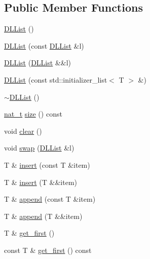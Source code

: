 \subsection*{Public Member Functions}
\begin{DoxyCompactItemize}
\item 
\hyperlink{class_designar_1_1_d_l_list_af85c4b65efde3c33ad011bf6bb7444b0}{D\+L\+List} ()
\item 
\hyperlink{class_designar_1_1_d_l_list_a4be2c1cdec495bacc879851956e96d9d}{D\+L\+List} (const \hyperlink{class_designar_1_1_d_l_list}{D\+L\+List} \&l)
\item 
\hyperlink{class_designar_1_1_d_l_list_a8408964dd17ca747a9a21b141b05630e}{D\+L\+List} (\hyperlink{class_designar_1_1_d_l_list}{D\+L\+List} \&\&l)
\item 
\hyperlink{class_designar_1_1_d_l_list_a8a6c4e93a8eaf2b113c1b86d0e05f406}{D\+L\+List} (const std\+::initializer\+\_\+list$<$ T $>$ \&)
\item 
\hyperlink{class_designar_1_1_d_l_list_a095cfa30b7eba01f1dc7e3fe6d35f013}{$\sim$\+D\+L\+List} ()
\item 
\hyperlink{namespace_designar_aa72662848b9f4815e7bf31a7cf3e33d1}{nat\+\_\+t} \hyperlink{class_designar_1_1_d_l_list_a77234df6ebb6620ecf124e1810d9741c}{size} () const
\item 
void \hyperlink{class_designar_1_1_d_l_list_a0b617ee4b2f03b58b74630f79566f1b8}{clear} ()
\item 
void \hyperlink{class_designar_1_1_d_l_list_a34bdcc8016583c3e0ab50b4d3a87117b}{swap} (\hyperlink{class_designar_1_1_d_l_list}{D\+L\+List} \&l)
\item 
T \& \hyperlink{class_designar_1_1_d_l_list_ad153fdaa8982b2276266e1e0dbb8b773}{insert} (const T \&item)
\item 
T \& \hyperlink{class_designar_1_1_d_l_list_a4a88465e07f8708eea591614b5822bb6}{insert} (T \&\&item)
\item 
T \& \hyperlink{class_designar_1_1_d_l_list_a0999bcc1ce1d5b89d54c9993735dc469}{append} (const T \&item)
\item 
T \& \hyperlink{class_designar_1_1_d_l_list_a62918b133f72c5fa1c580f823642e5fa}{append} (T \&\&item)
\item 
T \& \hyperlink{class_designar_1_1_d_l_list_aa089dc5d48f092cc91d2237606e131e7}{get\+\_\+first} ()
\item 
const T \& \hyperlink{class_designar_1_1_d_l_list_a7dc30042ed6cd04f964504e2ff2e5653}{get\+\_\+first} () const
\item 

\end{DoxyCompactItemize}
